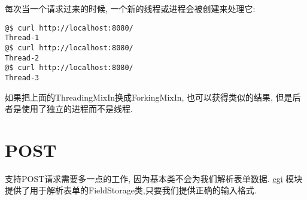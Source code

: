 \documentclass[a4paper,10pt,english]{manual}
\begin{document}
每次当一个请求过来的时候, 一个新的线程或进程会被创建来处理它:

\begin{Verbatim}[commandchars=@\[\]]
@$ curl http://localhost:8080/
Thread-1
@$ curl http://localhost:8080/
Thread-2
@$ curl http://localhost:8080/
Thread-3
\end{Verbatim}

如果把上面的ThreadingMixIn换成ForkingMixIn, 也可以获得类似的结果, 但是后者是使用了独立的进程而不是线程.


\section{POST}

支持POST请求需要多一点的工作, 因为基本类不会为我们解析表单数据. \href{http://docs.python.org/lib/module-cgi.html}{cgi} 模块提供了用于解析表单的FieldStorage类,只要我们提供正确的输入格式.
\end{document}
